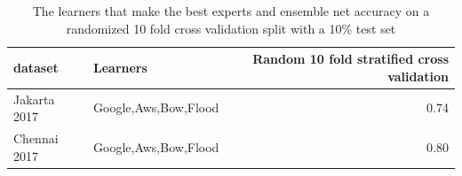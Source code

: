 \begin{table}
\centering

\begin{tabular}{llr}
\toprule
      dataset &              Learners &  Random 10 fold stratified cross validation \\
\hline
 Jakarta 2017 &     Google,Aws,Bow,Flood &                                        0.74 \\
\midrule
 Chennai 2017 &  Google,Aws,Bow,Flood &                                        0.80 \\
\bottomrule
\end{tabular}

\caption{The learners that make the best experts and ensemble net accuracy on a randomized 10 fold cross validation split with a 10\% test set}\label{table:ensemble_short_acc}
\end{table}
